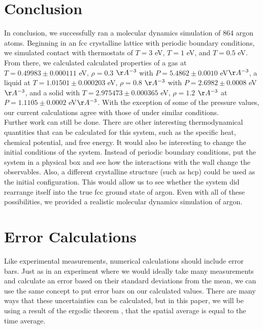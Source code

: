 \documentclass{article}
\begin{document}
\begin{multicols}{2}
\section{Conclusion}
\label{conc}

In conclusion, we successfully ran a molecular dynamics simulation of 864 argon atoms.  Beginning in an fcc crystalline lattice with periodic boundary conditions, we simulated contact with thermostats of $T=3$ eV, $T=1$ eV, and $T=0.5$ eV.  From there, we calculated calculated properties of a gas at $T=0.49983 \pm 0.000111$ eV, $\rho=0.3$ $\AA ^{-3}$ with $P=5.4862 \pm 0.0010 $ eV$\AA^{-3}$, a liquid at $T= 1.01501 \pm 0.000203$ eV, $\rho =0.8$ $\AA ^{-3}$ with $P=2.6982 \pm 0.0008$ eV$\AA^{-3}$, and a solid with $T=2.975473 \pm 0.000365$  eV, $\rho=1.2$ $\AA ^{-3}$ at $P=1.1105 \pm 0.0002 $ eV$\AA^{-3}$.  With the exception of some of the pressure values, our current calculations agree with those of \cite{thijssen} under similar conditions.  \\

Further work can still be done.  There are other interesting thermodynamical quantities that can be calculated for this system, such as the specific heat, chemical potential, and free energy.  It would also be interesting to change the initial conditions of the system.  Instead of periodic boundary conditions, put the system in a physical box and see how the interactions with the wall change the observables.  Also, a different crystalline structure (such as hcp) could be used as the initial configuration.  This would allow us to see whether the system did rearrange itself into the true fcc ground state of argon.  Even with all of these possibilities, we provided a realistic molecular dynamics simulation of argon.  

\appendix 

\section{Error Calculations}

Like experimental measurements, numerical calculations should include error bars.  Just as in an experiment where we would ideally take many measurements and calculate an error based on their standard deviations from the mean, we can use the same concept to put error bars on our calculated values.  There are many ways that these uncertainties can be calculated, but in this paper, we will be using a result of the ergodic theorem \cite{Birkhoff}, that the spatial average is equal to the time average.  \\


\end{multicols}
\end{document}
